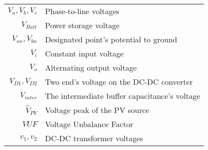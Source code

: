 \begin{scriptsize}
\begin{tabularx}{\textwidth}{r|X}
$V_{a},V_{b},V_{c}$  					& Phase-to-line voltages\\
$V_{Batt}$  					& Power storage voltage\\
$V_{an},V_{bn}$  									& Designated point's potential to ground \\
$V_i$															& Constant input voltage\\
$V_o$															& Alternating output voltage\\
$V_{D1},V_{D2}$ 									& Two end's voltage on the DC-DC converter\\
$V_{inter}$															& The intermediate buffer capacitance's voltage\\
$\hat{V}_{PV}$															& Voltage peak of the PV source\\
$VUF$  														& Voltage Unbalance Factor\\
$v_1,v_2$                         & DC-DC transformer voltages\\

\end{tabularx}
\end{scriptsize}
